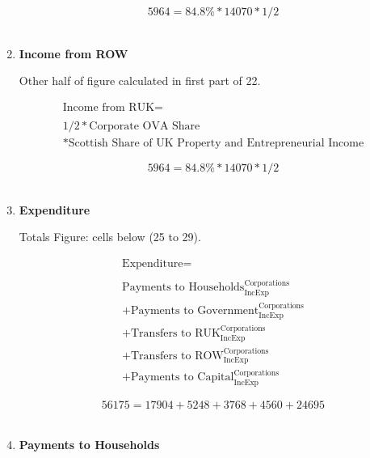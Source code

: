 \begin{enumerate}
\begin{equation} \nonumber
5964 = 84.8\%*14070*1/2
\end{equation}\\


\item \textbf {Income from ROW}

Other half of figure calculated in first part of 22.

\begin{equation}
\begin{split}
\text{Income from RUK} =  \\ \\
1/2*\text{Corporate OVA Share}\\
*\text{Scottish Share of UK Property and Entrepreneurial Income}
\end{split} \label{eq:2.5.27}
\end{equation}

\begin{equation} \nonumber
5964 = 84.8\%*14070*1/2
\end{equation}\\


\pagebreak

\item \textbf {Expenditure}

Totals Figure: cells below (25 to 29).

\begin{equation}
\begin{split}
\text{Expenditure} =  \\ \\
\text{Payments to Households}^\text{Corporations}_\text{IncExp}\\
+\text{Payments to Government}^\text{Corporations}_\text{IncExp}\\
+\text{Transfers to RUK}^\text{Corporations}_\text{IncExp}\\
+\text{Transfers to ROW}^\text{Corporations}_\text{IncExp}\\
+\text{Payments to Capital}^\text{Corporations}_\text{IncExp}
\end{split} \label{eq:2.5.28}
\end{equation}

\begin{equation} \nonumber
56175 = 17904+5248+3768+4560+24695
\end{equation}\\


\item \textbf {Payments to Households}


\end{enumerate}
